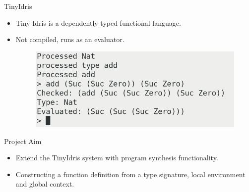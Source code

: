 \documentclass[presentation]{beamer}
\begin{document}
\begin{frame}[fragile]{TinyIdris}
  \begin{itemize}
  \item Tiny Idris is a dependently typed functional language.
  \item Not compiled, runs as an evaluator.
    \begin{block}{}
      \begin{figure} 
        \includegraphics[scale=0.4]{./Resource/addEval.png}
      \end{figure}
    \end{block}
  \end{itemize}
\end{frame}

\begin{frame}[fragile]{Project Aim}
  \begin{itemize}
    \item Extend the TinyIdris system with program synthesis functionality.\\
    \item Constructing a function definition from a type signature, local
          environment and global context.
  \end{itemize}
\end{frame}
\end{document}

